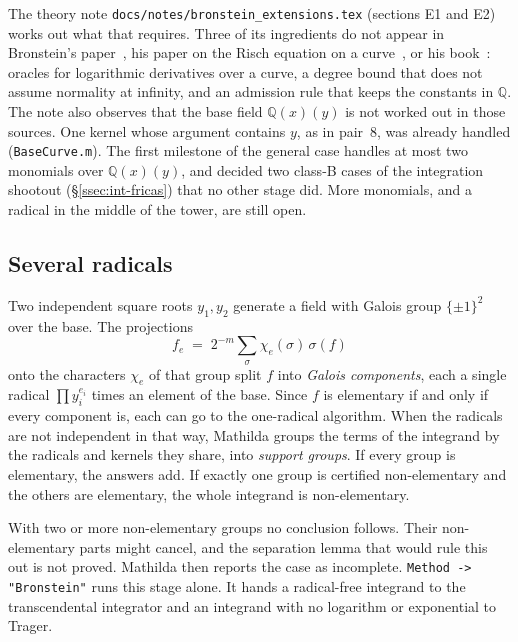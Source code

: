 The theory note \texttt{docs/notes/bronstein\_extensions.tex} (sections E1 and E2)
works out what that requires. Three of its ingredients do not appear in
Bronstein's paper~\cite{bronstein1990}, his paper on the Risch equation on a
curve~\cite{bronstein1991}, or his book~\cite{bronstein2005}: oracles for
logarithmic derivatives over a curve, a degree bound that does not assume
normality at infinity, and an admission rule that keeps the constants in
\(\mathbb{Q}\). The note also observes that the base field \(\mathbb{Q}(x)(y)\) is
not worked out in those sources. One kernel whose argument contains \(y\), as in
pair~8, was already handled (\texttt{BaseCurve.m}). The first milestone of the
general case handles at most two monomials over \(\mathbb{Q}(x)(y)\), and decided
two class-B cases of the integration shootout (\S\ref{ssec:int-fricas}) that no
other stage did. More monomials, and a radical in the
middle of the tower, are still open.

\subsection{Several radicals}
\label{ssec:int-galois}

Two independent square roots \(y_1, y_2\) generate a field with Galois group
\(\{\pm1\}^2\) over the base. The projections
\[
  f_e \;=\; 2^{-m}\sum_{\sigma}\chi_e(\sigma)\,\sigma(f)
\]
onto the characters \(\chi_e\) of that group split \(f\) into \emph{Galois
components}, each a single radical
\(\prod y_i^{e_i}\) times an element of the base. Since \(f\) is elementary if and
only if every component is, each can go to the one-radical algorithm.
When the radicals are not independent in that way, Mathilda groups the terms of the
integrand by the radicals and kernels they share, into \emph{support
groups}. If every group is elementary, the
answers add. If exactly one group is certified non-elementary and the others are
elementary, the whole integrand is non-elementary.

\begin{codepairs}
\end{codepairs}

With two or more non-elementary groups no conclusion follows. Their
non-elementary parts might cancel, and the separation lemma that would rule this
out is not proved. Mathilda then reports the case as incomplete.
\texttt{Method -> "Bronstein"} runs this stage alone. It
hands a radical-free integrand to the transcendental integrator and an integrand
with no logarithm or exponential to Trager.

